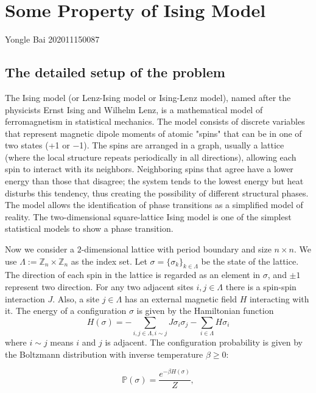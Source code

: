 \documentclass[11pt,openany]{book}              %
\begin{document}
\chapter*{Some Property of Ising Model}
\vspace{-1cm}
{\fontsize{18.0pt}{\baselineskip}\selectfont  Yongle Bai 202011150087}

\section{The detailed setup of the problem}
The Ising model (or Lenz-Ising model or Ising-Lenz model), named after the physicists Ernst Ising and Wilhelm Lenz, is a mathematical model of ferromagnetism in statistical mechanics.
The model consists of discrete variables that represent magnetic dipole moments of atomic "spins" that can be in one of two states (+1 or −1).
The spins are arranged in a graph, usually a lattice (where the local structure repeats periodically in all directions), allowing each spin to interact with its neighbors.
Neighboring spins that agree have a lower energy than those that disagree; the system tends to the lowest energy but heat disturbs this tendency, thus creating the possibility of different structural phases.
The model allows the identification of phase transitions as a simplified model of reality.
The two-dimensional square-lattice Ising model is one of the simplest statistical models to show a phase transition.

Now we consider a \(2\)-dimensional lattice with period boundary and size \(n \times n\).
We use \(\Lambda:=\mathbb{Z}_n \times \mathbb{Z}_n\) as the index set.
Let \(\sigma=\{ \sigma_k\}_{k \in \Lambda}\) be the state of the lattice.
The direction of each spin in the lattice is regarded as an element in \(\sigma\), and \(\pm 1\) represent two direction.
For any two adjacent sites \(i,j\in \Lambda \) there is a spin-spin interaction \(J\).
Also, a site \(j\in \Lambda \) has an external magnetic field \(H\) interacting with it. The energy of a configuration \(\sigma\) is given by the Hamiltonian function
\begin{equation}\label{equ:1}
  H(\sigma)=-\sum_{i,j\in\Lambda,i \sim j} J \sigma_i \sigma_j-\sum_{i \in \Lambda}H \sigma_i
\end{equation}
where \(i \sim j\) means \(i\) and \(j\) is adjacent.
The configuration probability is given by the Boltzmann distribution with inverse temperature \( \beta \geq 0\):

\[ \mathbb{P}(\sigma )={\frac {e^{-\beta H(\sigma )}}{Z}},\]
\end{document}
